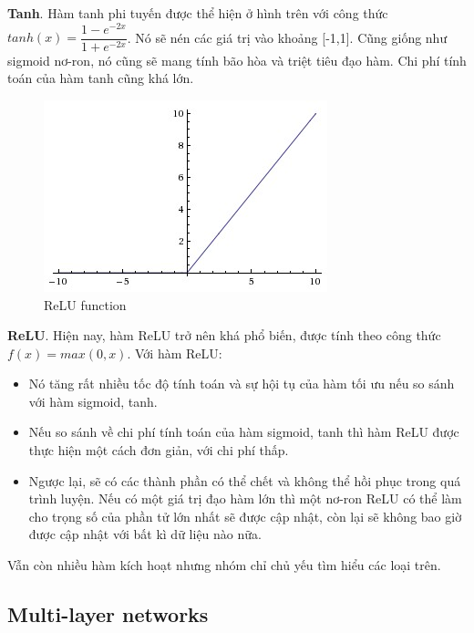 \textbf{Tanh}. Hàm tanh phi tuyến được thể hiện ở hình trên với công thức $tanh(x)=\dfrac{1-e^{-2x}}{1+e^{-2x}} $. Nó sẽ nén các giá trị vào khoảng [-1,1]. Cũng giống như sigmoid nơ-ron, nó cũng sẽ mang tính bão hòa và triệt tiêu đạo hàm. Chi phí tính toán của hàm tanh cũng khá lớn.

\begin{center}
   \begin{figure}[htp]
   \begin{center}
     \includegraphics[scale=.5]{image/relu}
    \end{center}
    \caption{ReLU function}
    \label{fig:tanh}
    \end{figure}
\end{center}

\textbf{ReLU}. Hiện nay, hàm ReLU trở nên khá phổ biến, được tính theo công thức $f(x)=max(0,x)$. Với hàm ReLU:
\begin{itemize}
	\item Nó tăng rất nhiều tốc độ tính toán và sự hội tụ của hàm tối ưu nếu so sánh với hàm sigmoid, tanh.
	\item Nếu so sánh về chi phí tính toán của hàm sigmoid, tanh thì hàm ReLU được thực hiện một cách đơn giản, với chi phí thấp.
	\item Ngược lại, sẽ có các thành phần có thể chết và không thể hồi phục trong quá trình luyện. Nếu có một giá trị đạo hàm lớn thì một nơ-ron ReLU có thể làm cho trọng số của phần tử lớn nhất sẽ được cập nhật, còn lại sẽ không bao giờ được cập nhật với bất kì dữ liệu nào nữa. 
\end{itemize}

Vẫn còn nhiều hàm kích hoạt nhưng nhóm chỉ chủ yếu tìm hiểu các loại trên.

\subsection{Multi-layer networks}

